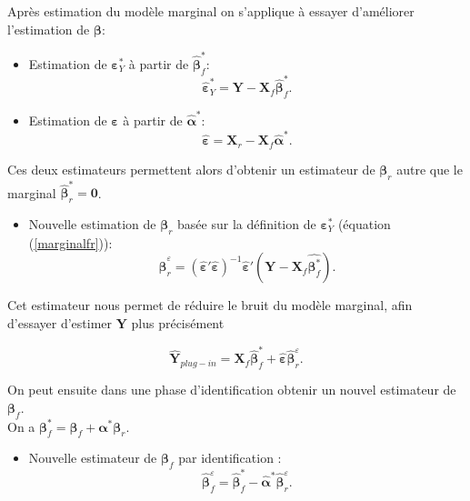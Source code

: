 \documentclass[12pt,a4paper]{report}
\begin{document}
Après estimation du modèle marginal on s'applique à essayer d'améliorer l'estimation de $\boldsymbol{\beta}$: 
\begin{itemize}
	\item Estimation de  $\boldsymbol{\varepsilon}_Y^*$ à partir de $\hat{\boldsymbol{\beta}}^*_f$:
	\begin{equation}
		\hat{\boldsymbol{\varepsilon}}_Y^*=\boldsymbol{Y}-\boldsymbol{X}_f\hat{\boldsymbol{\beta}}^*_f. \nonumber 
	\end{equation}
	\item Estimation de $\boldsymbol{\varepsilon}$ à partir de $\hat{\boldsymbol{\alpha}}^*$:
	\begin{equation}
		\hat{\boldsymbol{\varepsilon}}=\boldsymbol{X}_r-\boldsymbol{X}_f\hat{\boldsymbol{\alpha}}^* .\label{epsilonchapeaufr}
	\end{equation}
\end{itemize}
Ces deux estimateurs permettent alors d'obtenir un estimateur de $\boldsymbol{\beta}_r$ autre que le marginal $\hat{\boldsymbol{\beta}}^*_r=\boldsymbol{0}$.
\begin{itemize}
	\item Nouvelle estimation de $\boldsymbol{\beta}_r$ basée sur la définition de $\boldsymbol{\varepsilon}_Y^* $ (équation (\ref{marginalfr})):
	\begin{equation}
		\hat{\boldsymbol{\beta}}_r^{\varepsilon}=(\hat{\boldsymbol{\varepsilon}}'\hat{\boldsymbol{\varepsilon}})^{-1}\hat{\boldsymbol{\varepsilon}}'(\boldsymbol{Y}- \boldsymbol{X}_f\hat{\boldsymbol{\beta}^*_f}). \nonumber 
	\end{equation}
\end{itemize}
Cet estimateur nous permet de réduire le bruit du modèle marginal, afin d'essayer d'estimer  $\boldsymbol{Y} $ plus précisément

\begin{equation}
	\hat{\boldsymbol{Y}}_{plug-in}=\boldsymbol{X}_f\hat{\boldsymbol{\beta}}^*_f + \hat{\boldsymbol{\varepsilon}}\hat{\boldsymbol{\beta}}_{r}^{\varepsilon}. \nonumber 
\end{equation}

		On peut ensuite dans une phase d'identification obtenir un nouvel estimateur de $\boldsymbol{\beta}_f$.\\On a $\boldsymbol{\beta}^*_f=\boldsymbol{\beta}_f+\boldsymbol{\alpha}^*\boldsymbol{\beta}_r $.
		\begin{itemize}
			\item Nouvelle estimateur de $\boldsymbol{\beta}_f $ par identification :
			\begin{equation}
			\hat{\boldsymbol{\beta}}_f^{\varepsilon}=\hat{\boldsymbol{\beta}}^*_f-\hat{\boldsymbol{\alpha}}^*\hat{\boldsymbol{\beta}}_{r}^{\varepsilon}. \nonumber 
			\end{equation}
		\end{itemize}
	
\end{document}
